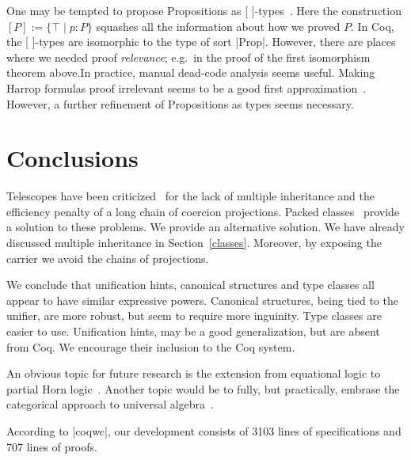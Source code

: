 \documentclass[a4paper,10pt, runningheads]{llncs}
\begin{document}
One may be tempted to propose Propositions as [ ]-types~\cite{awodey2004propositions}. Here the
construction $[P]:=\{\top\mid p:P\}$ squashes all the information about how we proved $P$. In Coq,
the [ ]-types are isomorphic to the type of sort |Prop|. However,
there are places where we needed proof \emph{relevance}; e.g.\ in the proof of the first isomorphism
theorem above.In practice, manual dead-code analysis seems useful. Making Harrop formulas proof
irrelevant seems to be a good first approximation~\cite{lcf:spi:03}. However, a further refinement
of Propositions as types seems necessary.

\section{Conclusions}
Telescopes have been criticized~\cite{Packed} for the lack of multiple inheritance and
the efficiency penalty of a long chain of coercion projections. Packed classes~\cite{Packed} provide
a solution to these problems. We provide an alternative solution. We have already
discussed multiple inheritance in Section~\ref{classes}. Moreover, by exposing the
carrier we avoid the chains of projections.

We conclude that unification hints, canonical structures and type classes all appear to have
similar expressive powers. Canonical structures, being tied to the unifier, are more robust, but
seem to require more inguinity. Type classes are easier to use. Unification hints, may be a
good generalization, but are absent from Coq. We encourage their inclusion to the
Coq system.

An obvious topic for future research is the extension from equational logic to partial Horn
logic~\cite{palmgren2007partial}. Another topic would be to fully, but practically, embrase the
categorical approach to universal algebra~\cite{pitts2001categorical}.

According to |coqwc|, our development consists of 3103 lines of specifications and 707 lines of
proofs.


% 
\end{document}
